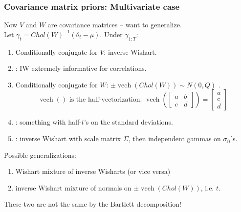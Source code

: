 \documentclass[xcolor=dvipsnames]{beamer}
\DeclareMathOperator{\vech}{vech}
\begin{document}
\begin{frame}
\frametitle{Covariance matrix priors: Multivariate case}
Now $V$ and $W$ are covariance matrices -- want to generalize.\\
Let $\gamma_t= Chol(W)^{-1}(\theta_t - \mu)$. \pause Under $\gamma_{1:T}$:
\begin{enumerate}
\item Conditionally conjugate for $V$: inverse Wishart.
\item \citet{alvarez2014cov}: IW extremely informative for correlations.
\item Conditionally conjugate for $W$: $\pm\vech(Chol(W))\sim N(0,Q)$ \citep{fruhwirth2008bayesian}.\\
\[
\mbox{$\vech()$ is the half-vectorization:  }\vech\left(\begin{bmatrix} a & b \\ c & d \end{bmatrix}\right) = \begin{bmatrix}a\\c\\d\end{bmatrix}
\]

\item \citet{gelman2006prior}: something with half-$t$'s on the standard deviations.
\item \citet{huang2013simple}: inverse Wishart with scale matrix $\Sigma$, then independent gammas on $\sigma_{ii}$'s.
\end{enumerate}
\pause Possible generalizations:\\
\begin{enumerate}
\item Wishart mixture of inverse Wisharts (or vice versa)
\item inverse Wishart mixture of normals on $\pm\vech(Chol(W))$, i.e. $t$.
\end{enumerate}
\pause These two are not the same by the Bartlett decomposition! 
\end{frame}



\end{document}
